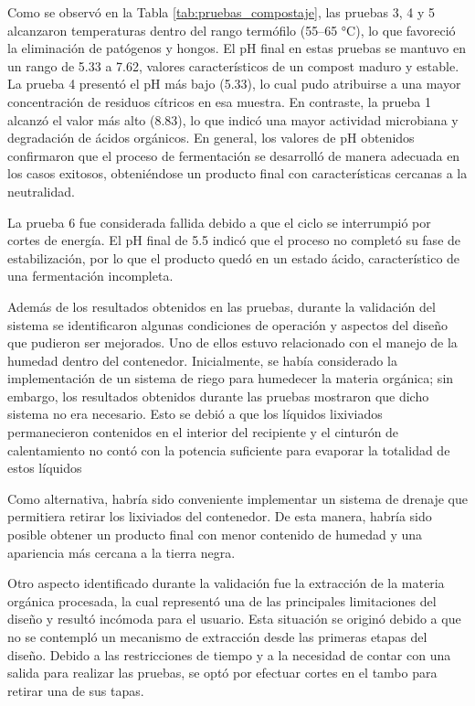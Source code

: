 Como se observó en la Tabla \ref{tab:pruebas_compostaje}, las pruebas 3, 4 y 5 alcanzaron temperaturas dentro del rango termófilo (55--65 °C), lo que favoreció la eliminación de patógenos y hongos. El pH final en estas pruebas se mantuvo en un rango de 5.33 a 7.62, valores característicos de un compost maduro y estable. La prueba 4 presentó el pH más bajo (5.33), lo cual pudo atribuirse a una mayor concentración de residuos cítricos en esa muestra. En contraste, la prueba 1 alcanzó el valor más alto (8.83), lo que indicó una mayor actividad microbiana y degradación de ácidos orgánicos. En general, los valores de pH obtenidos confirmaron que el proceso de fermentación se desarrolló de manera adecuada en los casos exitosos, obteniéndose un producto final con características cercanas a la neutralidad.

La prueba 6 fue considerada fallida debido a que el ciclo se interrumpió por cortes de energía. El pH final de 5.5 indicó que el proceso no completó su fase de estabilización, por lo que el producto quedó en un estado ácido, característico de una fermentación incompleta.

Además de los resultados obtenidos en las pruebas, durante la validación del sistema se identificaron algunas condiciones de operación y aspectos del diseño que pudieron ser mejorados. Uno de ellos estuvo relacionado con el manejo de la humedad dentro del contenedor. Inicialmente, se había considerado la implementación de un sistema de riego para humedecer la materia orgánica; sin embargo, los resultados obtenidos durante las pruebas mostraron que dicho sistema no era necesario. Esto se debió a que los líquidos lixiviados permanecieron contenidos en el interior del recipiente y el cinturón de calentamiento no contó con la potencia suficiente para evaporar la totalidad de estos líquidos

Como alternativa, habría sido conveniente implementar un sistema de drenaje que permitiera retirar los lixiviados del contenedor. De esta manera, habría sido posible obtener un producto final con menor contenido de humedad y una apariencia más cercana a la tierra negra.

Otro aspecto identificado durante la validación fue la extracción de la materia orgánica procesada, la cual representó una de las principales limitaciones del diseño y resultó incómoda para el usuario. Esta situación se originó debido a que no se contempló un mecanismo de extracción desde las primeras etapas del diseño. Debido a las restricciones de tiempo y a la necesidad de contar con una salida para realizar las pruebas, se optó por efectuar cortes en el tambo para retirar una de sus tapas.

